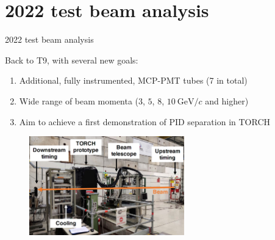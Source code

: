 \documentclass[xcolor={dvipsnames}]{beamer}
\begin{document}
\section{2022 test beam analysis}
\begin{frame}{2022 test beam analysis}
  \vspace{0.0cm}
  \begin{center}
    {\large Back to T9, with several new goals:}
  \end{center}
  \begin{enumerate}
    \setlength\itemsep{1.0em}
    \item{Additional, fully instrumented, MCP-PMT tubes (7 in total)}
    \item{Wide range of beam momenta ($3$, $5$, $8$, $\SI{10}{\giga\eV/c}$ and higher)}
    \item{Aim to achieve a first demonstration of PID separation in TORCH}
  \end{enumerate}
  \begin{figure}
    \centering
    \includegraphics[width = 0.6\textwidth]{Figs/TORCH_overview.png}
  \end{figure}
\end{frame}
\end{document}
